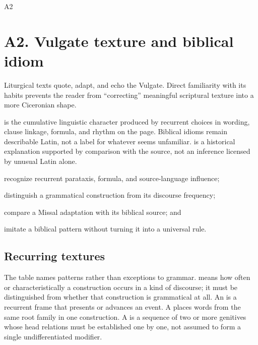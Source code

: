 \begin{courseunit}{A2}
\chapter{A2. Vulgate texture and biblical idiom}

Liturgical texts quote, adapt, and echo the Vulgate. Direct familiarity with
its habits prevents the reader from ``correcting'' meaningful scriptural
texture into a more Ciceronian shape.

 is the cumulative linguistic character produced by recurrent
choices in wording, clause linkage, formula, and rhythm on the page. Biblical
idioms remain describable Latin, not a label for whatever seems unfamiliar.
 is a historical explanation supported by
comparison with the source, not an inference licensed by unusual Latin alone.

\begin{learningobjectives}
  \item recognize recurrent parataxis, formula, and source-language influence;
  \item distinguish a grammatical construction from its discourse frequency;
  \item compare a Missal adaptation with its biblical source; and
  \item imitate a biblical pattern without turning it into a universal rule.
\end{learningobjectives}

\section{Recurring textures}

The table names patterns rather than exceptions to grammar.  means how often or characteristically a construction occurs in a
kind of discourse; it must be distinguished from whether that construction is
grammatical at all. An  is a recurrent frame that presents
or advances an event. A  places words from the same
root family in one construction. A  is a sequence of two
or more genitives whose head relations must be established one by one, not
assumed to form a single undifferentiated modifier.


\end{courseunit}
